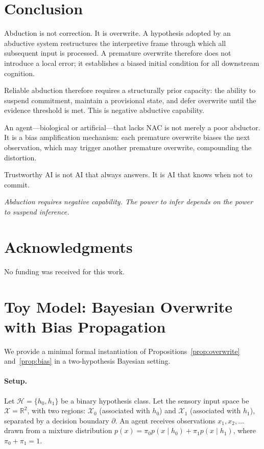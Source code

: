 \documentclass[12pt]{article}
\begin{document}
\section{Conclusion}

Abduction is not correction.
It is overwrite.
A hypothesis adopted by an abductive system restructures the
interpretive frame through which all subsequent input is processed.
A premature overwrite therefore does not introduce a local error;
it establishes a biased initial condition for all downstream cognition.

Reliable abduction therefore requires a structurally prior capacity:
the ability to suspend commitment, maintain a provisional state, and
defer overwrite until the evidence threshold is met.
This is negative abductive capability.

An agent---biological or artificial---that lacks NAC is not merely
a poor abductor. It is a bias amplification mechanism: each premature
overwrite biases the next observation, which may trigger another
premature overwrite, compounding the distortion.

Trustworthy AI is not AI that always answers.
It is AI that knows when not to commit.

\medskip
\noindent
\textit{Abduction requires negative capability.
The power to infer depends on the power to suspend inference.}

\section*{Acknowledgments}

No funding was received for this work.

\appendix
\section{Toy Model: Bayesian Overwrite with Bias Propagation}

We provide a minimal formal instantiation of Propositions~\ref{prop:overwrite}
and~\ref{prop:bias} in a two-hypothesis Bayesian setting.

\paragraph{Setup.}
Let $\mathcal{H} = \{h_0, h_1\}$ be a binary hypothesis class.
Let the sensory input space be $\mathcal{X} = \mathbb{R}^2$, with two
regions: $\mathcal{X}_0$ (associated with $h_0$) and
$\mathcal{X}_1$ (associated with $h_1$), separated by a decision
boundary $\partial$.
An agent receives observations $x_1, x_2, \ldots$ drawn from a
mixture distribution $p(x) = \pi_0 p(x \mid h_0) + \pi_1 p(x \mid h_1)$,
where $\pi_0 + \pi_1 = 1$.
\end{document}
